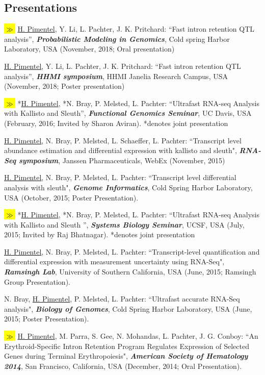 \documentclass[overlapped]{res}
\newcommand{\hlc}[2][blue]{ {\sethlcolor{#1} \hl{#2}} }
\newcommand{\hlpub}{\hlc[Dandelion]{{\color{white}$\gg$} }}
\begin{document}
\begin{resume}
\section{\sc Presentations}

\hlpub \underline{H. Pimentel}, Y. Li, L. Pachter, J. K. Pritchard: ``Fast intron retention QTL analysis'', {\bf \emph{Probabilistic Modeling in Genomics}}, Cold spring Harbor Laboratory, USA (November, 2018; Oral presentation)

\underline{H. Pimentel}, Y. Li, L. Pachter, J. K. Pritchard: ``Fast intron retention QTL analysis'', {\bf \emph{HHMI symposium}}, HHMI Janelia Research Campus, USA (November, 2018; Poster presentation)

\hlpub *\underline{H. Pimentel}, *N. Bray, P. Melsted, L. Pachter: ``Ultrafast RNA-seq Analysis with Kallisto and Sleuth'', {\bf \emph{Functional Genomics Seminar}}, UC Davis, USA (February, 2016; Invited by Sharon Aviran). *denotes joint presentation

\underline{H. Pimentel}, N. Bray, P. Melsted, L. Schaeffer, L. Pachter: ``Transcript level abundance estimation and differential expression with kallisto and sleuth", {\bf \emph{RNA-Seq symposium}}, Janssen Pharmaceuticals, WebEx (November, 2015)

\underline{H. Pimentel}, N. Bray, P. Melsted, L. Pachter: ``Transcript level differential analysis with sleuth", {\bf \emph{Genome Informatics}}, Cold Spring Harbor
Laboratory, USA (October, 2015; Poster Presentation).

\hlpub *\underline{H. Pimentel}, *N. Bray, P. Melsted, L. Pachter: ``Ultrafast RNA-seq Analysis with Kallisto and Sleuth '', {\bf \emph{Systems Biology Seminar}}, UCSF, USA (July, 2015; Invited by Raj Bhatnagar). *denotes joint presentation

\underline{H. Pimentel}, N. Bray, P. Melsted, L. Pachter: ``Transcript-level
quantification and differential expression with measurement uncertainty using
RNA-Seq", {\bf \emph{Ramsingh Lab}}, University of Southern California, USA (June,
2015; Ramsingh Group Presentation).

N. Bray, \underline{H. Pimentel}, P. Melsted, L. Pachter: ``Ultrafast accurate
RNA-Seq analysis", {\bf \emph{Biology of Genomes}}, Cold Spring Harbor
Laboratory, USA (June, 2015; Poster Presentation).

\newpage

\hlpub \underline{H. Pimentel}, M. Parra, S. Gee, N. Mohandas, L. Pachter, J. G.
Conboy: ``An Erythroid-Specific Intron Retention Program Regulates Expression
of Selected Genes during Terminal Erythropoiesis", {\bf \emph{American Society
    of Hematology 2014}}, San Francisco, California, USA (December, 2014; Oral
Presentation).


\end{resume}
\end{document}
